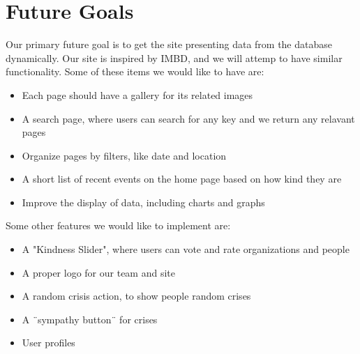 \documentclass[12pt]{report}
\begin{document}
\newpage
\section*{Future Goals}
\hfill


Our primary future goal is to get the site presenting data from the database dynamically.
Our site is inspired by IMBD, and we will attemp to have similar functionality.
Some of these items we would like to have are:
\begin{itemize}
\item Each page should have a gallery for its related images
\item A search page, where users can search for any key and we return any relavant pages
\item Organize pages by filters, like date and location
\item A short list of recent events on the home page based on how kind they are
\item Improve the display of data, including charts and graphs
\end{itemize}

Some other features we would like to implement are:
\begin{itemize}
\item A  "Kindness Slider", where users can vote and rate organizations and people
\item A proper logo for our team and site
\item A random crisis action, to show people random crises
\item A ¨sympathy button¨ for crises
\item User profiles
\end{itemize}
\end{document}
